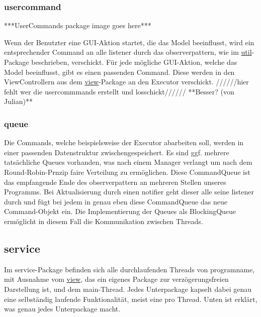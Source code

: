       \subsubsection{usercommand}
      \label{subsubsec:usercommand}
      ***UserCommands package image goes here***
      \newline
      \newline

      Wenn der Benutzter eine GUI-Aktion startet, die das Model beeinflusst,
      wird ein entsprechender Command an alle \gls{listener} durch das \gls{observerpattern}, wie im
      \hyperref[subsec:util]{util}-Package beschrieben, verschickt. Für jede mögliche
      GUI-Aktion, welche das Model beeinflusst, gibt es einen passenden Command.
      Diese werden in den ViewControllern aus dem \hyperref[subsec:view]{view}-Package
      an den Executor verschickt.
      //////hier fehlt wer die usercommmands erstellt und losschickt////// **Besser? (von Julian)**

      \subsubsection{queue}
      \label{subsubsec:queue}
      Die Commands, welche beispielsweise der Executor abarbeiten soll, werden in einer passenden Datenstruktur zwischengespeichert. Es
      sind ggf. mehrere tatsächliche Queues vorhanden, was nach einem Manager verlangt
      um nach dem Round-Robin-Prnzip faire Verteilung zu ermöglichen. Diese CommandQueue ist das empfangende Ende des \gls{observerpattern} an mehreren Stellen unseres Programms.
      Bei Aktualisierung durch einen \gls{notifier} geht dieser alle seine \gls{listener} durch und fügt bei jedem in genau eben diese CommandQueue das neue Command-Objekt ein.
      Die Implementierung der Queues als BlockingQueue ermöglicht in diesem Fall die Kommunikation zwischen Threads.

\subsection{service}
\label{subsec:service}

Im service-Package befinden sich alle durchlaufenden Threads von \gls{programname},
mit Ausnahme vom \hyperref[subsec:view]{view}, das ein eigenes Package zur verzögerungsfreien Darstellung ist, und dem
main-Thread. Jedes Unterpackage kapselt dabei genau eine selbständig laufende Funktionalität, meist eine pro Thread. Unten ist erklärt, was genau jedes Unterpackage macht.

